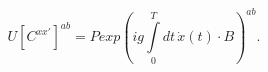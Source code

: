 \begin{equation}
U[C^{xx'}]^{ab}=Pexp\left(ig\int\limits_0^Tdt\,\dot{x}(t)\cdot B\right)^{ab}.
\end{equation}

